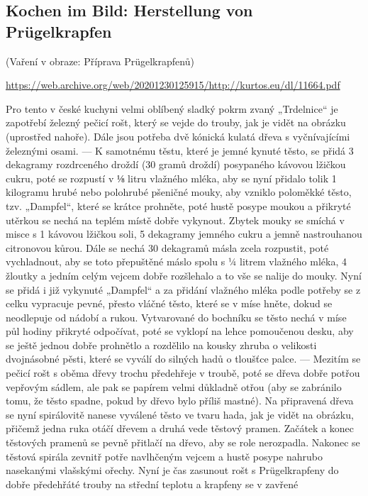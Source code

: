 \subsection{Kochen im Bild: Herstellung von
Prügelkrapfen}\label{250615-0047}

(Vaření v obraze: Příprava Prügelkrapfenů)

\url{https://web.archive.org/web/20201230125915/http://kurtos.eu/dl/11664.pdf}

Pro tento v české kuchyni velmi oblíbený sladký pokrm zvaný „Trdelnice``
je zapotřebí železný pečicí rošt, který se vejde do trouby, jak je vidět
na obrázku (uprostřed nahoře). Dále jsou potřeba dvě kónická kulatá
dřeva s vyčnívajícími železnými osami. --- K samotnému těstu, které je
jemné kynuté těsto, se přidá 3 dekagramy rozdrceného droždí (30 gramů
droždí) posypaného kávovou lžičkou cukru, poté se rozpustí v ⅛ litru
vlažného mléka, aby se nyní přidalo tolik 1 kilogramu hrubé nebo
polohrubé pšeničné mouky, aby vzniklo poloměkké těsto, tzv. „Dampfel``,
které se krátce prohněte, poté hustě posype moukou a přikryté utěrkou se
nechá na teplém místě dobře vykynout. Zbytek mouky se smíchá v misce s 1
kávovou lžičkou soli, 5 dekagramy jemného cukru a jemně nastrouhanou
citronovou kůrou. Dále se nechá 30 dekagramů másla zcela rozpustit, poté
vychladnout, aby se toto přepuštěné máslo spolu s ¼ litrem vlažného
mléka, 4 žloutky a jedním celým vejcem dobře rozšlehalo a to vše se
nalije do mouky. Nyní se přidá i již vykynuté „Dampfel`` a za přidání
vlažného mléka podle potřeby se z celku vypracuje pevné, přesto vláčné
těsto, které se v míse hněte, dokud se neodlepuje od nádobí a rukou.
Vytvarované do bochníku se těsto nechá v míse půl hodiny přikryté
odpočívat, poté se vyklopí na lehce pomoučenou desku, aby se ještě
jednou dobře prohnětlo a rozdělilo na kousky zhruba o velikosti
dvojnásobné pěsti, které se vyválí do silných hadů o tloušťce palce. ---
Mezitím se pečicí rošt s oběma dřevy trochu předehřeje v troubě, poté se
dřeva dobře potřou vepřovým sádlem, ale pak se papírem velmi důkladně
otřou (aby se zabránilo tomu, že těsto spadne, pokud by dřevo bylo
příliš mastné). Na připravená dřeva se nyní spirálovitě nanese vyválené
těsto ve tvaru hada, jak je vidět na obrázku, přičemž jedna ruka otáčí
dřevem a druhá vede těstový pramen. Začátek a konec těstových pramenů se
pevně přitlačí na dřevo, aby se role nerozpadla. Nakonec se těstová
spirála zevnitř potře navlhčeným vejcem a hustě posype nahrubo
nasekanými vlašskými ořechy. Nyní je čas zasunout rošt s Prügelkrapfeny
do dobře předehřáté trouby na střední teplotu a krapfeny se v zavřené
